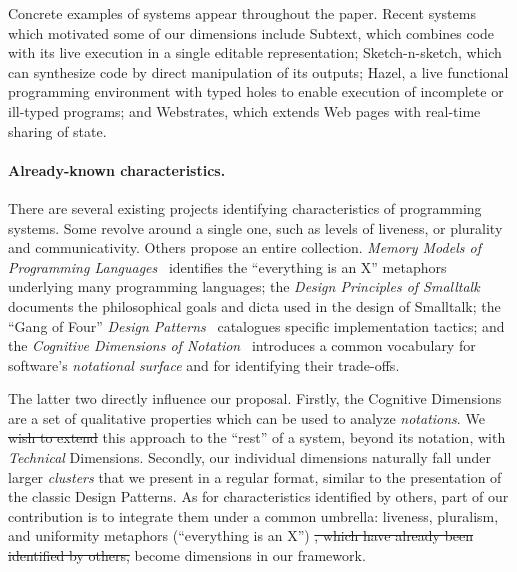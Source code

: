 \documentclass[english,submission]{programming}
\providecommand{\DIFadd}[1]{{\protect\color{blue}\uwave{#1}}} %
\providecommand{\DIFdel}[1]{{\protect\color{red}\sout{#1}}}                      %
\providecommand{\DIFaddbegin}{} %
\providecommand{\DIFaddend}{} %
\providecommand{\DIFdelbegin}{} %
\providecommand{\DIFdelend}{} %
\begin{document}
Concrete examples of systems appear throughout the paper. Recent systems
which motivated some of our dimensions include Subtext\DIFaddbegin \DIFadd{~}\DIFaddend \cite{Subtext},
which combines code with its live execution in a single editable
representation; Sketch-n-sketch\DIFaddbegin \DIFadd{~}\DIFaddend \cite{SnS}, which can synthesize code by
direct manipulation of its outputs; Hazel\DIFaddbegin \DIFadd{~}\DIFaddend \cite{Hazel}, a live
functional programming environment with typed holes to enable execution
of incomplete or ill-typed programs; and Webstrates\DIFaddbegin \DIFadd{~}\DIFaddend \cite{Webstrates},
which extends Web pages with real-time sharing of state.

\paragraph{Already-known characteristics.}

There are several existing projects identifying characteristics of
programming systems. Some revolve around a single one, such as levels of
liveness\DIFaddbegin \DIFadd{~}\DIFaddend \cite{Liveness}, or plurality and
communicativity\DIFaddbegin \DIFadd{~}\DIFaddend \cite{KellComm}. Others propose an entire collection.
\emph{Memory Models of Programming Languages}~\cite{MemMod} identifies
the ``everything is an X'' metaphors underlying many programming
languages; the \emph{Design Principles of Smalltalk}~\cite{STdesign}
documents the philosophical goals and dicta used in the design of
Smalltalk; the ``Gang of Four'' \emph{Design Patterns}~\cite{DesPats}
catalogues specific implementation tactics; and the \emph{Cognitive
Dimensions of Notation}~\cite{CogDims} introduces a common vocabulary
for software's \emph{notational surface} and for identifying their
trade-offs.

The latter two directly influence our proposal. Firstly, the Cognitive
Dimensions are a set of qualitative properties which can be used to
analyze \emph{notations}. We \DIFdelbegin \DIFdel{wish to extend }\DIFdelend \DIFaddbegin \DIFadd{are extending }\DIFaddend this approach to the ``rest''
of a system, beyond its notation, with \emph{Technical} Dimensions.
Secondly, our individual dimensions naturally fall under larger
\emph{clusters} that we present in a regular format, similar to the
presentation of the classic Design Patterns. As for characteristics
identified by others, part of our contribution is to integrate them
under a common umbrella: \DIFaddbegin \DIFadd{the existing concepts of }\DIFaddend liveness, pluralism,
and uniformity metaphors (``everything is an X'') \DIFdelbegin \DIFdel{, which have already been identified by others,
}\DIFdelend become dimensions in
our framework.
\end{document}
